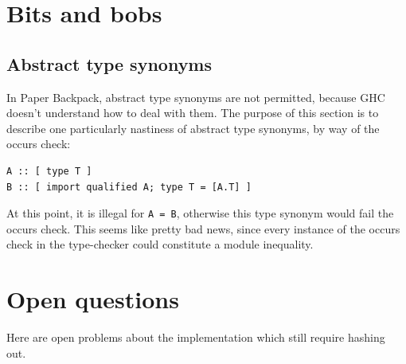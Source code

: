 \documentclass{article}
\begin{document}
\section{Bits and bobs}

\subsection{Abstract type synonyms}

In Paper Backpack, abstract type synonyms are not permitted, because GHC doesn't
understand how to deal with them.  The purpose of this section is to describe
one particularly nastiness of abstract type synonyms, by way of the occurs check:

\begin{verbatim}
A :: [ type T ]
B :: [ import qualified A; type T = [A.T] ]
\end{verbatim}

At this point, it is illegal for \verb|A = B|, otherwise this type synonym would
fail the occurs check.  This seems like pretty bad news, since every instance
of the occurs check in the type-checker could constitute a module inequality.

\section{Open questions}\label{sec:open-questions}

Here are open problems about the implementation which still require
hashing out.
\end{document}
